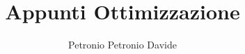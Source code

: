 \documentclass[12pt,a4paper,openany,oneside]{book}
\begin{document}


\title{Appunti Ottimizzazione}
\author{Petronio Petronio Davide}


\tableofcontents






\newpage
{}

\end{document}
